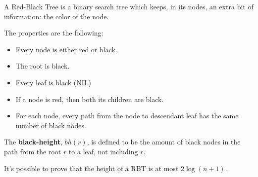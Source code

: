 A Red-Black Tree is a binary search tree which keeps, in its nodes,
an extra bit of information: the color of the node.

The properties are the following:

\begin{itemize}

	\item Every node is either red or black.
	\item The root is black.
	\item Every leaf is black (NIL)
	\item If a node is red, then both its children are black.
	\item For each node, every path from the node to descendant 
	leaf has the same number of black nodes.

\end{itemize}

The \textbf{black-height}, $bh(r)$, is defined to be the amount of black nodes in the path from
the root $r$ to a leaf, not including $r$. 

It's possible to prove that the height of a RBT is at most $2\log(n + 1)$.
